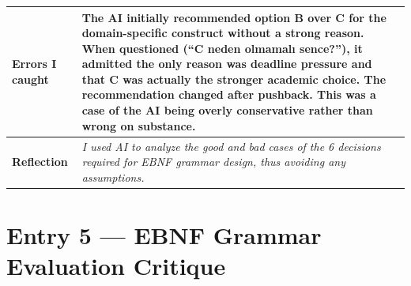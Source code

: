 \documentclass[a4paper,10pt]{article}
\begin{document}
\begin{tabular}{|
    >{\bfseries}m{3.5cm}|
    m{10cm}|
}
\hline
\rowcolor{altrow}
Errors I caught   & The AI initially recommended option B over C for the domain-specific construct without a strong reason. When questioned (``C neden olmamalı sence?''), it admitted the only reason was deadline pressure and that C was actually the stronger academic choice. The recommendation changed after pushback. This was a case of the AI being overly conservative rather than wrong on substance. \\
\hline
\rowcolor{white}
Reflection  & \textit{I used AI to analyze the good and bad cases of the 6 decisions required for EBNF grammar design, thus avoiding any assumptions.} \\
\hline
\end{tabular}

\newpage

\section{Entry 5 --- EBNF Grammar Evaluation Critique}
\end{document}
